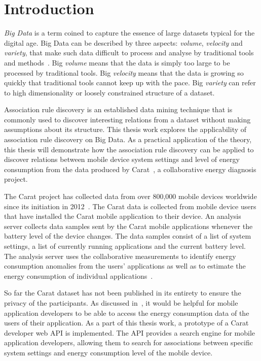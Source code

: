 \section{Introduction}

\textit{Big Data} is a term coined to capture the essence of large datasets typical for the digital age. Big Data can be described by three aspects: \textit{volume}, \textit{velocity} and \textit{variety}, that make such data difficult to process and analyse by traditional tools and methods~\cite{doi:10.1108/LR-06-2015-0061}. Big \textit{volume} means that the data is simply too large to be processed by traditional tools. Big \textit{velocity} means that the data is growing so quickly that traditional tools cannot keep up with the pace. Big \textit{variety} can refer to high dimensionality or loosely constrained structure of a dataset.

Association rule discovery is an established data mining technique that is commonly used to discover interesting relations from a dataset without making assumptions about its structure. This thesis work explores the applicability of association rule discovery on Big Data. As a practical application of the theory, this thesis will demonstrate how the association rule discovery can be applied to discover relations between mobile device system settings and level of energy consumption from the data produced by Carat~\cite{Oliner:2013:CCE:2517351.2517354}, a collaborative energy diagnosis project.

The Carat project has collected data from over 800,000 mobile devices worldwide since its initiation in 2012~\cite{7840871}. The Carat data is collected from mobile device users that have installed the Carat mobile application to their device. An analysis server collects data samples sent by the Carat mobile applications whenever the battery level of the device changes. The data samples consist of a list of system settings, a list of currently running applications and the current battery level. The analysis server uses the collaborative measurements to identify energy consumption anomalies from the users' applications as well as to estimate the energy consumption of individual applications~\cite{Oliner:2013:CCE:2517351.2517354}.

So far the Carat dataset has not been published in its entirety to ensure the privacy of the participants. As discussed in~\cite{7840871}, it would be helpful for mobile application developers to be able to access the energy consumption data of the users of their application. As a part of this thesis work, a prototype of a Carat developer web API is implemented. The API provides a search engine for mobile application developers, allowing them to search for associations between specific system settings and energy consumption level of the mobile device.   

